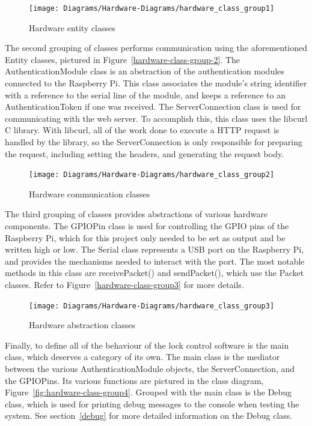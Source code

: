 \documentclass[12pt]{report}
\begin{document}
\begin{figure}
    \texttt{[image: Diagrams/Hardware-Diagrams/hardware\_class\_group1]}
    \caption{Hardware entity classes}
    \label{fig:hardware-class-group1}
\end{figure}

The second grouping of classes performs communication using the aforementioned Entity classes, pictured in 
Figure~\ref{hardware-class-group-2}. The AuthenticationModule 
class is an abstraction of the authentication modules connected to the Raspberry Pi. This class associates the module's 
string identifier with a reference to the serial line of the module, and keeps a reference to an AuthenticationToken if 
one was received. The ServerConnection class is used for communicating with the web server. To accomplish this, this 
class uses the libcurl C library. With libcurl, all of the work done to execute a HTTP request is handled by the 
library, so the ServerConnection is only responsible for preparing the request, including setting the headers, and 
generating the request body.

\begin{figure}
    \centering
    \texttt{[image: Diagrams/Hardware-Diagrams/hardware\_class\_group2]}
    \caption{Hardware communication classes}
    \label{fig:hardware-class-group2}
\end{figure}

The third grouping of classes provides abstractions of various hardware components. The GPIOPin class is used for 
controlling the GPIO pins of the Raspberry Pi, which for this project only needed to be set as output and be written 
high or low. The Serial class represents a USB port on the Raspberry Pi, and provides the mechanisms needed to interact 
with the port. The most notable methods in this class are receivePacket() and sendPacket(), which use the Packet 
classes. Refer to Figure~\ref{hardware-class-group3} for more details.

\begin{figure}
    \texttt{[image: Diagrams/Hardware-Diagrams/hardware\_class\_group3]}
    \caption{Hardware abstraction classes}
    \label{fig:hardware-class-group3}
\end{figure}

Finally, to define all of the behaviour of the lock control software is the main class, which deserves a category of 
its own. The main class is the mediator between the various AuthenticationModule objects, the ServerConnection, and the 
GPIOPins. Its various functions are pictured in the class diagram, Figure~\ref{fig:hardware-class-group4}. Grouped with 
the main class is the Debug class, which is used for printing debug messages to the console when testing the system. 
See section~\ref{debug} for more detailed information on the Debug class.
\end{document}
